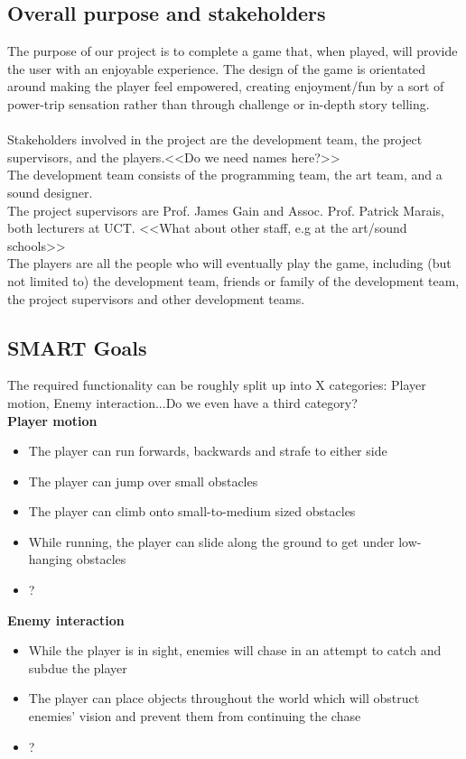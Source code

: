 \documentclass[a4paper,10pt]{article}
\begin{document}
\subsection{Overall purpose and stakeholders}
The purpose of our project is to complete a game that, when played, will provide the user with an enjoyable experience. The design of the game is orientated around making the player feel empowered, creating enjoyment/fun by a sort of power-trip sensation rather than through challenge or in-depth story telling.
\\ \\
Stakeholders involved in the project are the development team, the project supervisors, and the players.<<Do we need names here?>> \\
The development team consists of the programming team, the art team, and a sound designer. \\
The project supervisors are Prof. James Gain and Assoc. Prof. Patrick Marais, both lecturers at UCT. <<What about other staff, e.g at the art/sound schools>> \\
The players are all the people who will eventually play the game, including (but not limited to) the development team, friends or family of the development team, the project supervisors and other development teams.

\subsection{SMART Goals}
The required functionality can be roughly split up into X categories: Player motion, Enemy interaction...Do we even have a third category? \\
\textbf{Player motion}
\begin{itemize}
	\item The player can run forwards, backwards and strafe to either side
	\item The player can jump over small obstacles
	\item The player can climb onto small-to-medium sized obstacles
	\item While running, the player can slide along the ground to get under low-hanging obstacles
	\item ?
\end{itemize}
\textbf{Enemy interaction}
\begin{itemize}
	\item While the player is in sight, enemies will chase in an attempt to catch and subdue the player
	\item The player can place objects throughout the world which will obstruct enemies' vision and prevent them from continuing the chase
	\item ?
\end{itemize}
\end{document}
